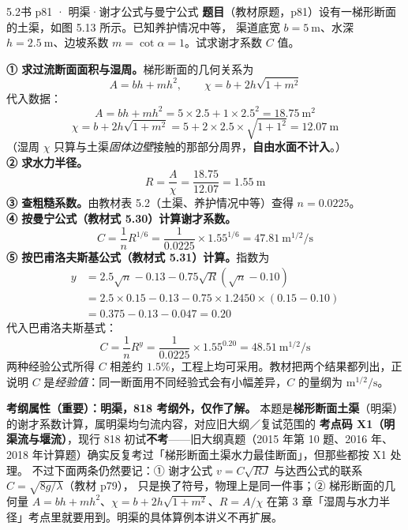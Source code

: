 \begin{liti}{5.2}{书 p81 · 明渠·谢才公式与曼宁公式}
\textbf{题目}（教材原题，p81）设有一梯形断面的土渠，如图 5.13 所示。已知养护情况中等，
渠道底宽 $b=5\ \mathrm{m}$、水深 $h=2.5\ \mathrm{m}$、边坡系数 $m=\cot\alpha=1$。试求谢才系数 $C$ 值。


\begin{jie}
\textbf{① 求过流断面面积与湿周。}梯形断面的几何关系为
\[ A=bh+mh^2,\qquad \chi=b+2h\sqrt{1+m^2} \]
代入数据：
\[ A=bh+mh^2=5\times2.5+1\times2.5^2=18.75\ \mathrm{m^2} \]
\[ \chi=b+2h\sqrt{1+m^2}=5+2\times2.5\times\sqrt{1+1^2}=12.07\ \mathrm{m} \]
（湿周 $\chi$ 只算与土渠\emph{固体边壁}接触的那部分周界，\textbf{自由水面不计入}。）\\
\textbf{② 求水力半径。}
\[ R=\frac{A}{\chi}=\frac{18.75}{12.07}=1.55\ \mathrm{m} \]
\textbf{③ 查粗糙系数。}由教材表 5.2（土渠、养护情况中等）查得 $n=0.0225$。\\
\textbf{④ 按曼宁公式（教材式 5.30）计算谢才系数。}
\[ C=\frac{1}{n}R^{1/6}=\frac{1}{0.0225}\times1.55^{1/6}=47.81\ \mathrm{m^{1/2}/s} \]
\textbf{⑤ 按巴甫洛夫斯基公式（教材式 5.31）计算。}指数为
\[
\begin{aligned}
y&=2.5\sqrt{n}-0.13-0.75\sqrt{R}\left(\sqrt{n}-0.10\right)\\
 &=2.5\times0.15-0.13-0.75\times1.2450\times(0.15-0.10)\\
 &=0.375-0.13-0.047=0.20
\end{aligned}
\]
代入巴甫洛夫斯基式：
\[ C=\frac{1}{n}R^{y}=\frac{1}{0.0225}\times1.55^{0.20}=48.51\ \mathrm{m^{1/2}/s} \]
两种经验公式所得 $C$ 相差约 $1.5\%$，工程上均可采用。教材把两个结果都列出，正说明
$C$ 是\emph{经验值}：同一断面用不同经验式会有小幅差异，$C$ 的量纲为 $\mathrm{m^{1/2}/s}$。
\end{jie}

\begin{tishi}
\textbf{考纲属性（重要）：明渠，818 考纲外，仅作了解。}
本题是\textbf{梯形断面土渠}（明渠）的谢才系数计算，属明渠均匀流内容，对应旧大纲／复试范围的
\textbf{考点码 X1（明渠流与堰流）}，现行 818 初试\textbf{不考}——旧大纲真题（2015 年第 10 题、2016 年、
2018 年计算题）确实反复考过「梯形断面土渠水力最佳断面」，但那些都按 X1 处理。
不过下面两条仍然要记：① 谢才公式 $v=C\sqrt{RJ}$ 与达西公式的联系 $C=\sqrt{8g/\lambda}$（教材 p79），
只是换了符号，物理上是同一件事；② 梯形断面的几何量 $A=bh+mh^2$、$\chi=b+2h\sqrt{1+m^2}$、$R=A/\chi$
在第 3 章「湿周与水力半径」考点里就要用到。明渠的具体算例本讲义不再扩展。
\end{tishi}
\end{liti}

